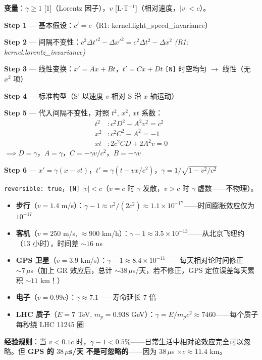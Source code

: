 \noindent\textbf{变量}：$\gamma \ge 1$ [1]（Lorentz 因子），$v$ [L$\cdot$T$^{-1}$]（相对速度，$|v| < c$）。

\begin{derivationbox}[推导]
  \textbf{Step 1} — 基本假设：$c' = c$（R1: kernel.light\_speed\_invariance）

  \textbf{Step 2} — 间隔不变性：$c^2\Delta t'^2 - \Delta x'^2 = c^2\Delta t^2 - \Delta x^2$
  \hfill\textit{(R1: kernel.lorentz\_invariance)}

  \textbf{Step 3} — 线性变换：$x' = Ax + Bt$，$t' = Cx + Dt$
  \hfill\texttt{[N]} 时空均匀 $\to$ 线性（无 $x^2$ 项）

  \textbf{Step 4} — 标准构型（S' 以速度 $v$ 相对 S 沿 $x$ 轴运动）

  \textbf{Step 5} — 代入间隔不变性，对照 $t^2$, $x^2$, $xt$ 系数：
  \begin{align*}
    t^2&: c^2D^2 - A^2v^2 = c^2\\
    x^2&: c^2C^2 - A^2 = -1\\
    xt&: 2c^2CD + 2A^2v = 0
  \end{align*}
  $\implies D = \gamma$，$A = \gamma$，$C = -\gamma v/c^2$，$B = -\gamma v$

  \textbf{Step 6} — $x' = \gamma(x-vt)$，$t' = \gamma(t-vx/c^2)$，$\gamma = 1/\sqrt{1-v^2/c^2}$
\end{derivationbox}

\texttt{reversible: true}，\texttt{[N]} $|v| < c$（$v=c$ 时 $\gamma$ 发散，$v>c$ 时 $\gamma$ 虚数——不物理）。

\begin{oombox}
  \begin{itemize}
    \item \textbf{步行}（$v=1.4$ m/s）：$\gamma-1 \approx v^2/(2c^2) \approx 1.1\times 10^{-17}$——时间膨胀效应仅为 $10^{-17}$
    \item \textbf{客机}（$v=250$ m/s, $\approx 900$ km/h）：$\gamma-1 \approx 3.5\times 10^{-13}$——从北京飞纽约（13 小时），时间差 $\sim 16$ ns
    \item \textbf{GPS 卫星}（$v=3.9$ km/s）：$\gamma-1 \approx 8.4\times 10^{-11}$——每天相对论时间修正 $\sim 7\,\mu$s（加上 GR 效应后，总计 $\sim 38\,\mu$s/天，若不修正，GPS 定位误差每天累积 $\sim 11$ km！）
    \item \textbf{电子}（$v=0.99c$）：$\gamma \approx 7.1$——寿命延长 7 倍
    \item \textbf{LHC 质子}（$E=7$ TeV, $m_p=0.938$ GeV）：$\gamma = E/m_pc^2 \approx 7460$——每个质子每秒绕 LHC 11245 圈
  \end{itemize}
  \textbf{经验规则}：当 $v < 0.1c$ 时，$\gamma-1 < 0.5\%$——日常生活中相对论效应完全可以忽略。但 \textbf{GPS 的 $38\,\mu$s/天 不是可忽略的}——因为 $38\,\mu$s $\times c \approx 11.4$ km。
\end{oombox}

